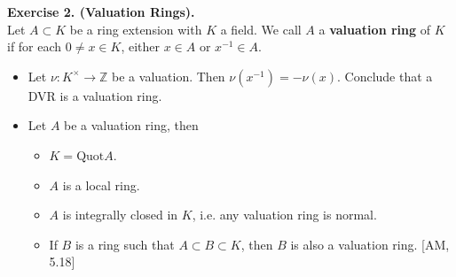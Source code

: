 \documentclass[12pt,a4paper,footinclude=true,headinclude=true]{scrbook} %
\newenvironment{exe}[2][Exercise]
    { \begin{mdframed}[backgroundcolor=gray!20] \textbf{#1 #2.}\\ }
    {  \end{mdframed}}
\begin{document}
\begin{exe}{2. (Valuation Rings)}
    \newline Let $A\subset K$ be a ring extension with $K$ a field. We call $A$ a \textbf{valuation ring} of $K$ if for each $0\neq x\in K$, either $x\in A$ or $x^{-1}\in A$.
    \begin{itemize}
        \item[(a)] Let $\nu:K^\times\to\mathbb{Z}$ be a valuation. Then $\nu(x^{-1})=-\nu(x)$. Conclude that a DVR is a valuation ring.
        \item[(b)] Let $A$ be a valuation ring, then
        \begin{itemize}[$\bullet$]
            \item $K=\mathrm{Quot}A$.
            \item $A$ is a local ring.
            \item $A$ is integrally closed in $K$, i.e. any valuation ring is normal.
            \item If $B$ is a ring such that $A\subset B\subset K$, then $B$ is also a valuation ring. [AM, 5.18]
        \end{itemize}
    \end{itemize}
\end{exe}
\end{document}
